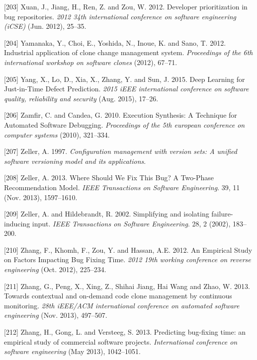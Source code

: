 \documentclass[12pt]{report}
\begin{document}
\hypertarget{ref-Xuan2012}{}
{[}203{]} Xuan, J., Jiang, H., Ren, Z. and Zou, W. 2012. Developer
prioritization in bug repositories. \emph{2012 34th international
conference on software engineering (iCSE)} (Jun. 2012), 25--35.

\hypertarget{ref-yamanaka2012industrial}{}
{[}204{]} Yamanaka, Y., Choi, E., Yoshida, N., Inoue, K. and Sano, T.
2012. Industrial application of clone change management system.
\emph{Proceedings of the 6th international workshop on software clones}
(2012), 67--71.

\hypertarget{ref-Yang2015}{}
{[}205{]} Yang, X., Lo, D., Xia, X., Zhang, Y. and Sun, J. 2015. Deep
Learning for Just-in-Time Defect Prediction. \emph{2015 iEEE
international conference on software quality, reliability and security}
(Aug. 2015), 17--26.

\hypertarget{ref-Zamfir2010}{}
{[}206{]} Zamfir, C. and Candea, G. 2010. Execution Synthesis: A
Technique for Automated Software Debugging. \emph{Proceedings of the 5th
european conference on computer systems} (2010), 321--334.

\hypertarget{ref-Zeller1997}{}
{[}207{]} Zeller, A. 1997. \emph{Configuration management with version
sets: A unified software versioning model and its applications}.

\hypertarget{ref-Zeller2013a}{}
{[}208{]} Zeller, A. 2013. Where Should We Fix This Bug? A Two-Phase
Recommendation Model. \emph{IEEE Transactions on Software Engineering}.
39, 11 (Nov. 2013), 1597--1610.

\hypertarget{ref-Zeller2002}{}
{[}209{]} Zeller, A. and Hildebrandt, R. 2002. Simplifying and isolating
failure-inducing input. \emph{IEEE Transactions on Software
Engineering}. 28, 2 (2002), 183--200.

\hypertarget{ref-Zhang2012}{}
{[}210{]} Zhang, F., Khomh, F., Zou, Y. and Hassan, A.E. 2012. An
Empirical Study on Factors Impacting Bug Fixing Time. \emph{2012 19th
working conference on reverse engineering} (Oct. 2012), 225--234.

\hypertarget{ref-Zhang2013a}{}
{[}211{]} Zhang, G., Peng, X., Xing, Z., Shihai Jiang, Hai Wang and
Zhao, W. 2013. Towards contextual and on-demand code clone management by
continuous monitoring. \emph{28th iEEE/ACM international conference on
automated software engineering} (Nov. 2013), 497--507.

\hypertarget{ref-Zhang2013}{}
{[}212{]} Zhang, H., Gong, L. and Versteeg, S. 2013. Predicting
bug-fixing time: an empirical study of commercial software projects.
\emph{International conference on software engineering} (May 2013),
1042--1051.
\end{document}
